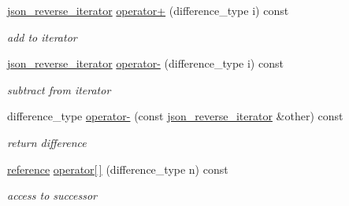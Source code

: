 \begin{DoxyCompactItemize}
\mbox{\hyperlink{classnlohmann_1_1detail_1_1json__reverse__iterator}{json\+\_\+reverse\+\_\+iterator}} \mbox{\hyperlink{classnlohmann_1_1detail_1_1json__reverse__iterator_aabf172b436988e2edde22f13f27caaed}{operator+}} (difference\+\_\+type i) const
\begin{DoxyCompactList}\small\item\em add to iterator \end{DoxyCompactList}\item 
\mbox{\label{classnlohmann_1_1detail_1_1json__reverse__iterator_a549c6eb10b6434eaf772f71d129a6d79}} 
\mbox{\hyperlink{classnlohmann_1_1detail_1_1json__reverse__iterator}{json\+\_\+reverse\+\_\+iterator}} \mbox{\hyperlink{classnlohmann_1_1detail_1_1json__reverse__iterator_a549c6eb10b6434eaf772f71d129a6d79}{operator-\/}} (difference\+\_\+type i) const
\begin{DoxyCompactList}\small\item\em subtract from iterator \end{DoxyCompactList}\item 
\mbox{\label{classnlohmann_1_1detail_1_1json__reverse__iterator_aaaa6c0b1d74e74e35e5f7b56dfd6c5d1}} 
difference\+\_\+type \mbox{\hyperlink{classnlohmann_1_1detail_1_1json__reverse__iterator_aaaa6c0b1d74e74e35e5f7b56dfd6c5d1}{operator-\/}} (const \mbox{\hyperlink{classnlohmann_1_1detail_1_1json__reverse__iterator}{json\+\_\+reverse\+\_\+iterator}} \&other) const
\begin{DoxyCompactList}\small\item\em return difference \end{DoxyCompactList}\item 
\mbox{\label{classnlohmann_1_1detail_1_1json__reverse__iterator_a8ed9e445e03c49c46612eb7f7d55bb61}} 
\mbox{\hyperlink{classnlohmann_1_1detail_1_1json__reverse__iterator_a42f51a69bac7b2aebb613b2164e457f1}{reference}} \mbox{\hyperlink{classnlohmann_1_1detail_1_1json__reverse__iterator_a8ed9e445e03c49c46612eb7f7d55bb61}{operator\mbox{[}$\,$\mbox{]}}} (difference\+\_\+type n) const
\begin{DoxyCompactList}\small\item\em access to successor \end{DoxyCompactList}\item 

\end{DoxyCompactItemize}
